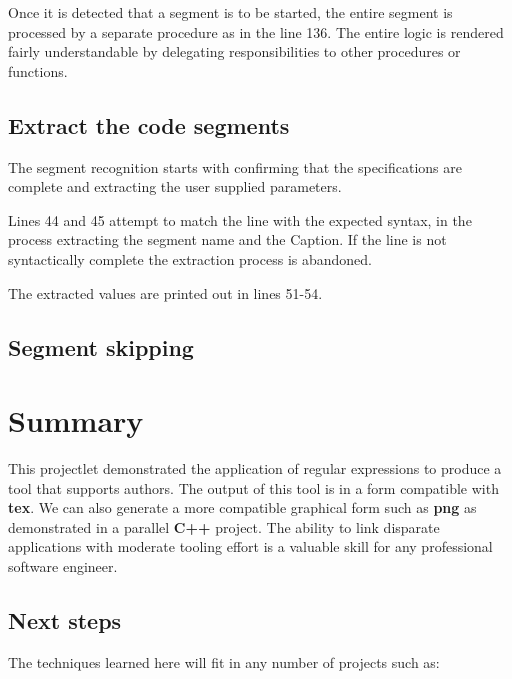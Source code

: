 \documentclass[12pt, a4paper]{article}
\begin{document}
Once it is detected that a segment is to be started, the entire segment is processed by a separate procedure as in the line 136. The entire logic is rendered fairly understandable by delegating responsibilities to other procedures or functions.

\subsection{Extract the code segments}
The segment recognition starts with confirming that the specifications are complete and extracting the user supplied parameters.


Lines 44 and 45 attempt to match the line with the expected syntax, in the process extracting the segment name and the Caption. If the line is not syntactically complete the extraction process is abandoned.

The extracted values are printed out in lines 51-54.

\subsection{Segment skipping}


\section{Summary}

This projectlet demonstrated the application of regular expressions to produce a tool that supports authors. The output of this tool is in a form compatible with \textbf{tex}. We can also generate a more compatible graphical form such as \textbf{png} as demonstrated in a parallel \textbf{C++} project. The ability to 
link disparate applications with moderate tooling effort is a valuable skill
for any professional software engineer.

\subsection{Next steps}

The techniques learned here will fit in any number of projects such as:
\end{document}
